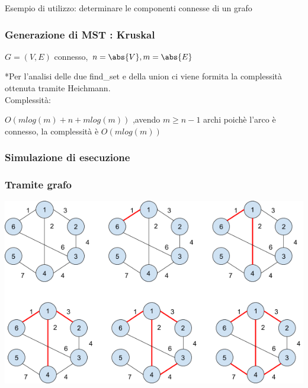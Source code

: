 \documentclass{article}
\begin{document}
{{{{Esempio di utilizzo: determinare le componenti connesse di un grafo}

\protect\hypertarget{t.9ae6642cabb7dfeda3c5292f67bce18bb08a8c38}{}{}\protect\hypertarget{t.41}{}{}



\hypertarget{h.tpoo55sx1m98}{\subsubsection{\texorpdfstring{{Generazione
di MST : Kruskal}}{Generazione di MST : Kruskal}}\label{h.tpoo55sx1m98}}

$G=(V,E)$ connesso, $n=\abs{V},m=\abs{E}$

\protect\hypertarget{t.4b86b9e72214bfde6e44300f060a45f33bae59c6}{}{}\protect\hypertarget{t.42}{}{}



{*Per l'analisi delle due find\_set e della union ci viene formita la
complessità ottenuta tramite Heichmann.\\
}{Complessità}{:}

{$O(mlog(m)+n+mlog(m))$ ,avendo $m \geq n-1$ archi poichè l'arco è connesso, la complessità è $O(mlog(m))$}

\hypertarget{h.4n5zx1ni4b2b}{\subsubsection{\texorpdfstring{{Simulazione
di esecuzione}}{Simulazione di esecuzione}}\label{h.4n5zx1ni4b2b}}

\subsubsection{Tramite grafo}

{\includegraphics{images/image519.png}}

}}}
\end{document}
